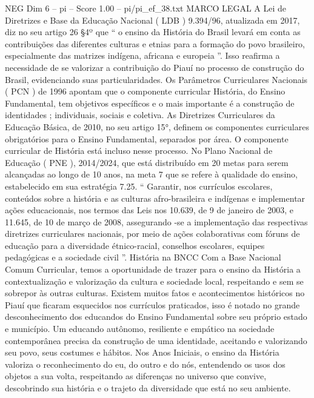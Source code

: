 \begin{textsample}{NEG Dim 6 – pi – Score 1.00 – pi/pi\_ef\_38.txt}  \label{ex:f6_neg_100}
MARCO LEGAL A Lei de Diretrizes e Base da Educação Nacional ( LDB ) 9.394/96, atualizada em 2017, diz no seu artigo 26 §4º que “ o ensino da História do Brasil levará em conta as contribuições das diferentes culturas e etnias para a formação do povo brasileiro, especialmente das matrizes indígena, africana e europeia ”.
Isso reafirma a necessidade de se valorizar a contribuição do Piauí no processo de construção do Brasil, evidenciando suas particularidades.
Os Parâmetros Curriculares Nacionais ( PCN ) de 1996 apontam que o componente curricular História, do Ensino Fundamental, tem objetivos específicos e o mais importante é a construção de identidades ; individuais, sociais e coletiva.
As Diretrizes Curriculares da Educação Básica, de 2010, no seu artigo 15{\EmojiFont °}, definem os componentes curriculares obrigatórios para o Ensino Fundamental, separados por área.
O componente curricular de História está incluso nesse processo.
No Plano Nacional de Educação ( PNE ), 2014/2024, que está distribuído em 20 metas para serem alcançadas ao longo de 10 anos, na meta 7 que se refere à qualidade do ensino, estabelecido em sua estratégia 7.25. “ Garantir, nos currículos escolares, conteúdos sobre a história e as culturas afro-brasileira e indígenas e implementar ações educacionais, nos termos das Leis nos 10.639, de 9 de janeiro de 2003, e 11.645, de 10 de março de 2008, assegurando -se a implementação das respectivas diretrizes curriculares nacionais, por meio de ações colaborativas com fóruns de educação para a diversidade étnico-racial, conselhos escolares, equipes pedagógicas e a sociedade civil ”.
História na BNCC Com a Base Nacional Comum Curricular, temos a oportunidade de trazer para o ensino da História a contextualização e valorização da cultura e sociedade local, respeitando e sem se sobrepor às outras culturas.
Existem muitos fatos e acontecimentos históricos no Piauí que ficaram esquecidos nos currículos praticados, isso é notado no grande desconhecimento dos educandos do Ensino Fundamental sobre seu próprio estado e município.
Um educando autônomo, resiliente e empático na sociedade contemporânea precisa da construção de uma identidade, aceitando e valorizando seu povo, seus costumes e hábitos.
Nos Anos Iniciais, o ensino da História valoriza o reconhecimento do eu, do outro e do nós, entendendo os usos dos objetos a sua volta, respeitando as diferenças no universo que convive, descobrindo sua história e o trajeto da diversidade que está no seu ambiente.

\end{textsample}
